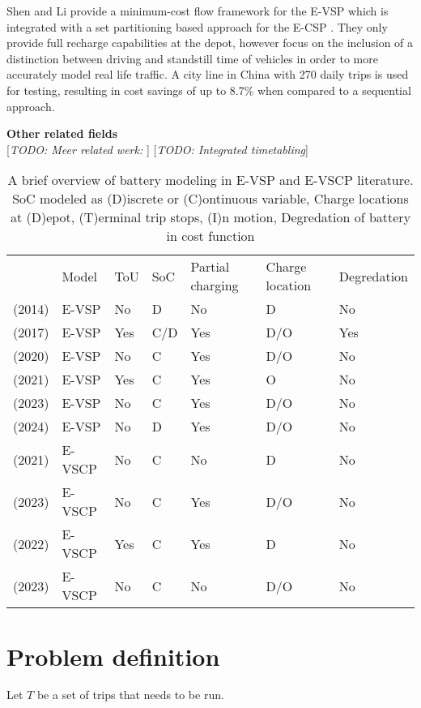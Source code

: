 \documentclass[ht]{article}
\newcommand{\todo}[1]{{\color{red}[\textit{TODO: #1}]}}
\begin{document}
Shen and Li provide a minimum-cost flow framework for the E-VSP which is integrated with a set partitioning based approach for the E-CSP \cite{Shen2023}. They only provide full recharge capabilities at the depot, however focus on the inclusion of a distinction between driving and standstill time of vehicles in order to more accurately model real life traffic. A city line in China with 270 daily trips is used for testing, resulting in cost savings of up to 8.7\% when compared to a sequential approach.

\noindent \textbf{Other related fields}\\
\todo{Meer related werk: }
\todo{Integrated timetabling} \cite{Stadnichuk2024}

\begin{table}[h]
  \centering
  \begin{tabular}{cllllll}
      \toprule
      & Model & ToU & SoC & Partial charging & Charge location & Degredation \\
      \cmidrule(lr){2-7}
      \cite{Li2014} (2014) & E-VSP & No & D & No & D & No \\
      \cite{vanKootenNiekerk2017} (2017) & E-VSP & Yes & C/D & Yes & D/O & Yes \\
      \cite{Olsen2020} (2020) & E-VSP & No & C & Yes & D/O & No \\ 
      \cite{Jiang2021} (2021) & E-VSP & Yes & C & Yes & O & No \\ 
      \cite{Parmentier2023} (2023) & E-VSP & No & C & Yes & D/O & No \\
      \cite{deVos2024} (2024) & E-VSP & No & D & Yes & D/O & No \\ 
      \addlinespace[0.4em]
      \cite{Perumal2021} (2021) & E-VSCP & No & C & No & D & No  \\
      \cite{Sistig2023} (2023) & E-VSCP & No & C & Yes & D/O & No \\
      \cite{Wang2022} (2022) & E-VSCP & Yes & C & Yes & D & No \\
      \cite{Shen2023} (2023) & E-VSCP & No & C & No & D/O & No \\
      \bottomrule
  \end{tabular}
  \caption{A brief overview of battery modeling in E-VSP and E-VSCP literature. SoC modeled as (D)iscrete or (C)ontinuous variable, Charge locations at (D)epot, (T)erminal trip stops, (I)n motion, Degredation of battery in cost function}
  \label{tab:evscp-lit}
\end{table}

\section{Problem definition}
\label{sec:problem_def}
Let $T$ be a set of trips that needs to be run. 
\printbibliography
\end{document}
